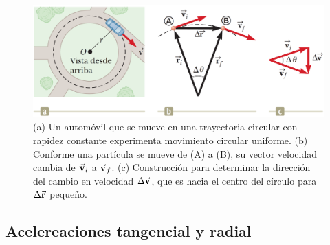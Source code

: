     \begin{figure}[H]
      \centering
      \includegraphics[scale=0.25]{1/graphics_4/figure_3}
      \caption{(a) Un automóvil que se mueve en una trayectoria circular con rapidez constante experimenta movimiento
      circular uniforme. (b) Conforme una partícula se mueve de (A) a (B), su vector velocidad cambia de $\vec{\mathbf{v}}_{i}$ a
      $\vec{\mathbf{v}}_{f}$. (c) Construcción para determinar la dirección del cambio en velocidad $\Delta \vec{\mathbf{v}}$, que es hacia
      el centro del círculo para $\Delta \vec{\mathbf{r}}$ pequeño.}
    \end{figure}

  \subsection{Acelereaciones tangencial y radial}
